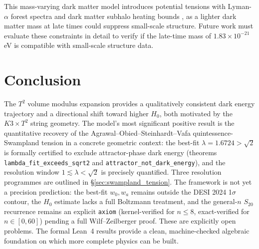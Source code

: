 \documentclass[12pt]{article}
\begin{document}
This mass-varying dark matter model introduces potential tensions with Lyman-$\alpha$ forest spectra \cite{irsic2017, rogers2021} and dark matter subhalo heating bounds \cite{webb2019, lelli2016sparc}, as a lighter dark matter mass at late times could suppress small-scale structure. Future work must evaluate these constraints in detail to verify if the late-time mass of $1.83 \times 10^{-21}$ eV is compatible with small-scale structure data.

\section{Conclusion}
The $T^2$ volume modulus expansion provides a qualitatively consistent dark energy trajectory and a directional shift toward higher $H_0$, both motivated by the $K3\times T^2$ string geometry. The model's most significant positive result is the quantitative recovery of the Agrawal--Obied--Steinhardt--Vafa quintessence-Swampland tension \cite{agrawal2018cosmological} in a concrete geometric context: the best-fit $\lambda = 1.6724 > \sqrt{2}$ is formally certified to exclude attractor-phase dark energy (theorems \texttt{lambda\_fit\_exceeds\_sqrt2} and \texttt{attractor\_not\_dark\_energy}), and the resolution window $1 \lesssim \lambda < \sqrt{2}$ is precisely quantified. Three resolution programmes are outlined in §\ref{sec:swampland_tension}. The framework is not yet a precision prediction: the best-fit $w_0,w_a$ remains outside the DESI 2024 1$\sigma$ contour, the $H_0$ estimate lacks a full Boltzmann treatment, and the general-$n$ $S_{20}$ recurrence remains an explicit \texttt{axiom} (kernel-verified for $n\le8$, exact-verified for $n\in[0,60]$) pending a full Wilf--Zeilberger proof. These are explicitly open problems. The formal Lean~4 results provide a clean, machine-checked algebraic foundation on which more complete physics can be built.

\vspace{1em}



\end{document}
